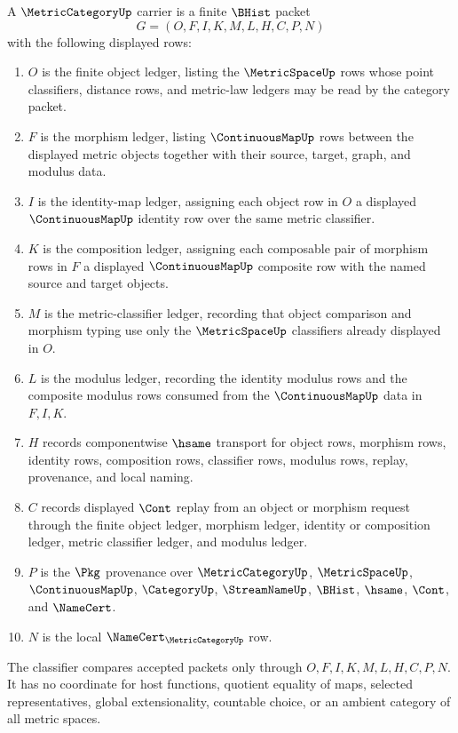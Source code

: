 \begin{definition}
\label{def:metric-category-carrier}
A $\MetricCategoryUp$ carrier is a finite $\BHist$ packet
$$
G=(O,F,I,K,M,L,H,C,P,N)
$$
with the following displayed rows:
\begin{enumerate}
\item $O$ is the finite object ledger, listing the $\MetricSpaceUp$ rows whose point classifiers, distance rows, and metric-law ledgers may be read by the category packet.
\item $F$ is the morphism ledger, listing $\ContinuousMapUp$ rows between the displayed metric objects together with their source, target, graph, and modulus data.
\item $I$ is the identity-map ledger, assigning each object row in $O$ a displayed $\ContinuousMapUp$ identity row over the same metric classifier.
\item $K$ is the composition ledger, assigning each composable pair of morphism rows in $F$ a displayed $\ContinuousMapUp$ composite row with the named source and target objects.
\item $M$ is the metric-classifier ledger, recording that object comparison and morphism typing use only the $\MetricSpaceUp$ classifiers already displayed in $O$.
\item $L$ is the modulus ledger, recording the identity modulus rows and the composite modulus rows consumed from the $\ContinuousMapUp$ data in $F,I,K$.
\item $H$ records componentwise $\hsame$ transport for object rows, morphism rows, identity rows, composition rows, classifier rows, modulus rows, replay, provenance, and local naming.
\item $C$ records displayed $\Cont$ replay from an object or morphism request through the finite object ledger, morphism ledger, identity or composition ledger, metric classifier ledger, and modulus ledger.
\item $P$ is the $\Pkg$ provenance over $\MetricCategoryUp$, $\MetricSpaceUp$, $\ContinuousMapUp$, $\CategoryUp$, $\StreamNameUp$, $\BHist$, $\hsame$, $\Cont$, and $\NameCert$.
\item $N$ is the local $\NameCert_{\MetricCategoryUp}$ row.
\end{enumerate}
The classifier compares accepted packets only through $O,F,I,K,M,L,H,C,P,N$. It has no coordinate for host functions, quotient equality of maps, selected representatives, global extensionality, countable choice, or an ambient category of all metric spaces.
\end{definition}

